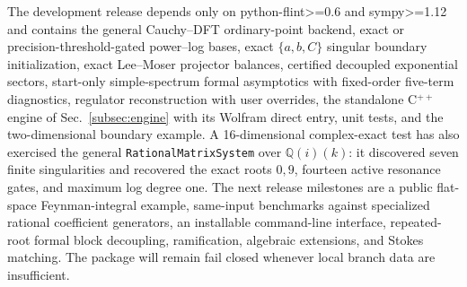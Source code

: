 \documentclass[11pt]{article}
\renewcommand{\_}{\origunderscore\allowbreak}
\begin{document}
The development release depends only on python-flint>=0.6 and sympy>=1.12 and contains the general Cauchy--DFT
ordinary-point backend, exact or precision-threshold-gated power--log bases, exact
$\{a,b,C\}$ singular boundary initialization, exact Lee--Moser projector balances,
certified decoupled exponential sectors, start-only simple-spectrum formal asymptotics with
fixed-order five-term diagnostics, regulator reconstruction with user overrides, the
standalone C$^{++}$ engine of Sec.~\ref{subsec:engine} with its Wolfram direct entry,
unit tests, and the
two-dimensional boundary example.  A 16-dimensional complex-exact test has also exercised
the general \texttt{Rational}\allowbreak\texttt{Matrix}\allowbreak\texttt{System} over
$\mathbb Q(i)(k)$: it
discovered seven finite
singularities and recovered the exact roots $0,9$, fourteen active resonance gates, and
maximum log degree one.  The next release milestones are a public flat-space
Feynman-integral example, same-input benchmarks against specialized rational coefficient
generators, an installable command-line interface, repeated-root formal block decoupling,
ramification, algebraic extensions, and Stokes matching.  The package will remain fail
closed whenever local branch data are insufficient.

\enlargethispage{1.5\baselineskip}


\end{document}
